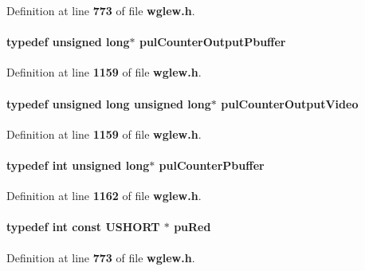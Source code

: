 Definition at line {\bf 773} of file {\bf wglew.\+h}.

\paragraph[{pul\+Counter\+Output\+Pbuffer}]{\setlength{\rightskip}{0pt plus 5cm}typedef unsigned long$\ast$ {\bf pul\+Counter\+Output\+Pbuffer}}\label{wglew_8h_a031065a3be8d68ea1e12f932eba82412}


Definition at line {\bf 1159} of file {\bf wglew.\+h}.

\paragraph[{pul\+Counter\+Output\+Video}]{\setlength{\rightskip}{0pt plus 5cm}typedef unsigned long unsigned long$\ast$ {\bf pul\+Counter\+Output\+Video}}\label{wglew_8h_a3872e7e43b4f47aa0aeda17b5ef2ecf9}


Definition at line {\bf 1159} of file {\bf wglew.\+h}.

\paragraph[{pul\+Counter\+Pbuffer}]{\setlength{\rightskip}{0pt plus 5cm}typedef {\bf int} unsigned long$\ast$ {\bf pul\+Counter\+Pbuffer}}\label{wglew_8h_ad4082f05d78fb03d2073e36cac99b511}


Definition at line {\bf 1162} of file {\bf wglew.\+h}.

\paragraph[{pu\+Red}]{\setlength{\rightskip}{0pt plus 5cm}typedef {\bf int} const U\+S\+H\+O\+RT $\ast$ {\bf pu\+Red}}\label{wglew_8h_af25e35df51ad9076738319dbc7a6c8a9}


Definition at line {\bf 773} of file {\bf wglew.\+h}.

